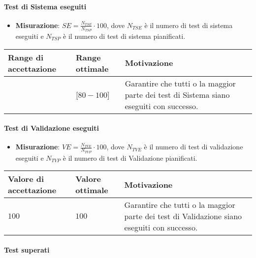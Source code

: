 \paragraph{Test di Sistema eseguiti}

\begin{itemize}
\item \textbf{Misurazione}: $SE=\frac{N_{TSE}}{N_{TSP}} \cdot 100$, dove $N_{TSE}$ è il numero di test di sistema eseguiti e $N_{TSP}$ è il numero di test di sistema pianificati.
\end{itemize}

\begin{center}
		\begin{tabular}{|P{2.5cm}|P{2.5cm}|P{6cm}|}
		\hline
			\textbf{Range di accettazione}	& \textbf{Range ottimale} & \textbf{Motivazione} \\
			\hline
			[$70 - 100$] & [$80 - 100$] &	Garantire che tutti o la maggior parte dei test di Sistema siano eseguiti con successo. \\
			\hline
			\end{tabular}
\end{center}

\paragraph{Test di Validazione eseguiti}

\begin{itemize}
\item \textbf{Misurazione}: $VE=\frac{N_{TVE}}{N_{TVP}} \cdot 100$, dove $N_{TVE}$ è il numero di test di validazione eseguiti e $N_{TVP}$ è il numero di test di Validazione pianificati.
\end{itemize}

\begin{center}
		\begin{tabular}{|P{2.5cm}|P{2.5cm}|P{6cm}|}
		\hline
			\textbf{Valore di accettazione}	& \textbf{Valore ottimale} & \textbf{Motivazione} \\
			\hline
			$100$ & $100$ &	Garantire che tutti o la maggior parte dei test di Validazione siano eseguiti con successo. \\
			\hline
			\end{tabular}
\end{center}

\paragraph{Test superati}

